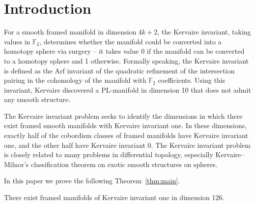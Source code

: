 \section{Introduction}\label{sec:intro}








For a smooth framed manifold in dimension $4k+2$, the Kervaire invariant, taking values in $\mathbb{F}_2$, determines whether the manifold could be converted into a homotopy sphere via surgery -- it takes value 0 if the manifold can be converted to a homotopy sphere and 1 otherwise. Formally speaking, the Kervaire invariant is defined as the Arf invariant of the quadratic refinement of the intersection pairing in the cohomology of the manifold with $\mathbb{F}_2$ coefficients. Using this invariant, Kervaire \cite{Kervaire} discovered a PL-manifold in dimension 10 that does not admit any smooth structure. 

The Kervaire invariant problem seeks to identify the dimensions in which there exist  framed smooth manifolds with Kervaire invariant one. In these dimensions, exactly half of the cobordism classes of framed manifolds have Kervaire invariant one, and the other half have Kervaire invariant 0. The Kervaire invariant problem is closely related to many problems in differential topology, especially Kervaire--Milnor's classification theorem \cite{KervaireMilnor} on exotic smooth structures on spheres. 


In this paper we prove the following Theorem~\ref{thm:main}.

\begin{theorem} \label{thm:main}
    There exist framed manifolds of Kervaire invariant one in dimension 126.
\end{theorem}

